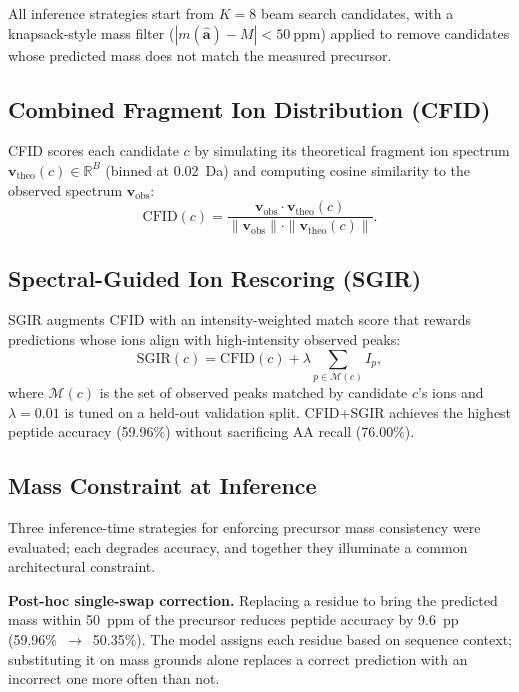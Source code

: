 \documentclass[10pt,twocolumn]{article}
\newcommand{\vect}[1]{\mathbf{#1}}
\newcommand{\R}{\mathbb{R}}
\begin{document}
All inference strategies start from $K\!=\!8$ beam search candidates, with a knapsack-style
mass filter ($|m(\hat{\vect{a}}) - M| < 50~\text{ppm}$) applied to remove candidates whose
predicted mass does not match the measured precursor.

\subsection{Combined Fragment Ion Distribution (CFID)}

CFID scores each candidate $c$ by simulating its theoretical fragment ion spectrum
$\vect{v}_{\text{theo}}(c) \in \R^B$ (binned at 0.02~Da) and computing cosine similarity to
the observed spectrum $\vect{v}_{\text{obs}}$:
\begin{equation}
  \text{CFID}(c) = \frac{\vect{v}_{\text{obs}} \cdot \vect{v}_{\text{theo}}(c)}
                        {\|\vect{v}_{\text{obs}}\| \cdot \|\vect{v}_{\text{theo}}(c)\|}.
  \label{eq:cfid}
\end{equation}

\subsection{Spectral-Guided Ion Rescoring (SGIR)}

SGIR augments CFID with an intensity-weighted match score that rewards predictions whose ions
align with high-intensity observed peaks:
\begin{equation}
  \text{SGIR}(c) = \text{CFID}(c) + \lambda \sum_{p \in \mathcal{M}(c)} I_p,
  \label{eq:sgir}
\end{equation}
where $\mathcal{M}(c)$ is the set of observed peaks matched by candidate $c$'s ions and
$\lambda\!=\!0.01$ is tuned on a held-out validation split.
CFID+SGIR achieves the highest peptide accuracy (59.96\%) without sacrificing AA recall (76.00\%).

\subsection{Mass Constraint at Inference}

Three inference-time strategies for enforcing precursor mass consistency were evaluated; each degrades accuracy, and together they illuminate a common architectural constraint.

\textbf{Post-hoc single-swap correction.} Replacing a residue to bring the predicted mass within
50~ppm of the precursor reduces peptide accuracy by 9.6~pp (59.96\%~$\to$~50.35\%).
The model assigns each residue based on sequence context; substituting it on mass grounds
alone replaces a correct prediction with an incorrect one more often than not.
\end{document}
